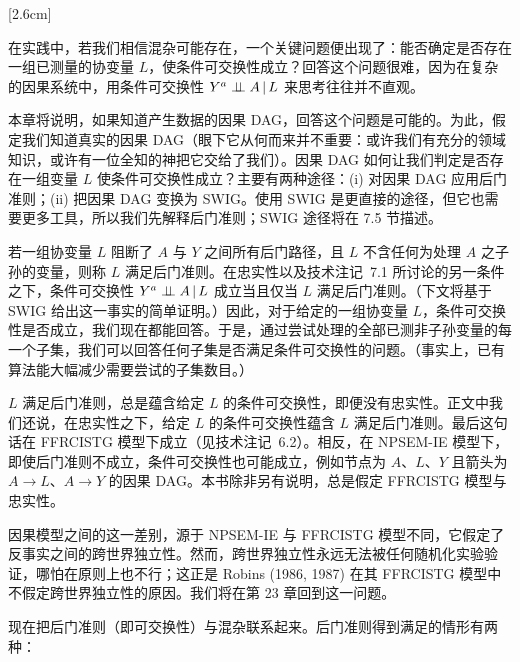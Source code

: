 [2.6cm]

在实践中，若我们相信混杂可能存在，一个关键问题便出现了：能否确定是否存在一组已测量的协变量 $L$，使条件可交换性成立？回答这个问题很难，因为在复杂的因果系统中，用条件可交换性 $Y^{a}\perp\!\!\!\perp A\,|\, L$ 来思考往往并不直观。

本章将说明，如果知道产生数据的因果 DAG，回答这个问题是可能的。为此，假定我们知道真实的因果 DAG（眼下它从何而来并不重要：或许我们有充分的领域知识，或许有一位全知的神把它交给了我们）。因果 DAG 如何让我们判定是否存在一组变量 $L$ 使条件可交换性成立？主要有两种途径：(i) 对因果 DAG 应用后门准则；(ii) 把因果 DAG 变换为 SWIG。使用 SWIG 是更直接的途径，但它也需要更多工具，所以我们先解释后门准则；SWIG 途径将在 7.5 节描述。

若一组协变量 $L$ 阻断了 $A$ 与 $Y$ 之间所有后门路径，且 $L$ 不含任何为处理 $A$ 之子孙的变量，则称 $L$ 满足后门准则。在忠实性以及技术注记~7.1 所讨论的另一条件之下，条件可交换性 $Y^{a}\perp\!\!\!\perp A\,|\, L$ 成立当且仅当 $L$ 满足后门准则。（下文将基于 SWIG 给出这一事实的简单证明。）因此，对于给定的一组协变量 $L$，条件可交换性是否成立，我们现在都能回答。于是，通过尝试处理的全部已测非子孙变量的每一个子集，我们可以回答任何子集是否满足条件可交换性的问题。（事实上，已有算法能大幅减少需要尝试的子集数目。）

\renewcommand{\TPname}{技术注记（Technical Point）}
\begin{techpoint}[条件可交换性是否蕴含后门准则？]
$L$ 满足后门准则，总是蕴含给定 $L$ 的条件可交换性，即便没有忠实性。正文中我们还说，在忠实性之下，给定 $L$ 的条件可交换性蕴含 $L$ 满足后门准则。最后这句话在 FFRCISTG 模型下成立（见技术注记~6.2）。相反，在 NPSEM-IE 模型下，即使后门准则不成立，条件可交换性也可能成立，例如节点为 $A$、$L$、$Y$ 且箭头为 $A\to L$、$A\to Y$ 的因果 DAG。本书除非另有说明，总是假定 FFRCISTG 模型与忠实性。

因果模型之间的这一差别，源于 NPSEM-IE 与 FFRCISTG 模型不同，它假定了反事实之间的跨世界独立性。然而，跨世界独立性永远无法被任何随机化实验验证，哪怕在原则上也不行；这正是 Robins (1986, 1987) 在其 FFRCISTG 模型中不假定跨世界独立性的原因。我们将在第 23 章回到这一问题。
\end{techpoint}
\renewcommand{\TPname}{技术注记}

现在把后门准则（即可交换性）与混杂联系起来。后门准则得到满足的情形有两种：

